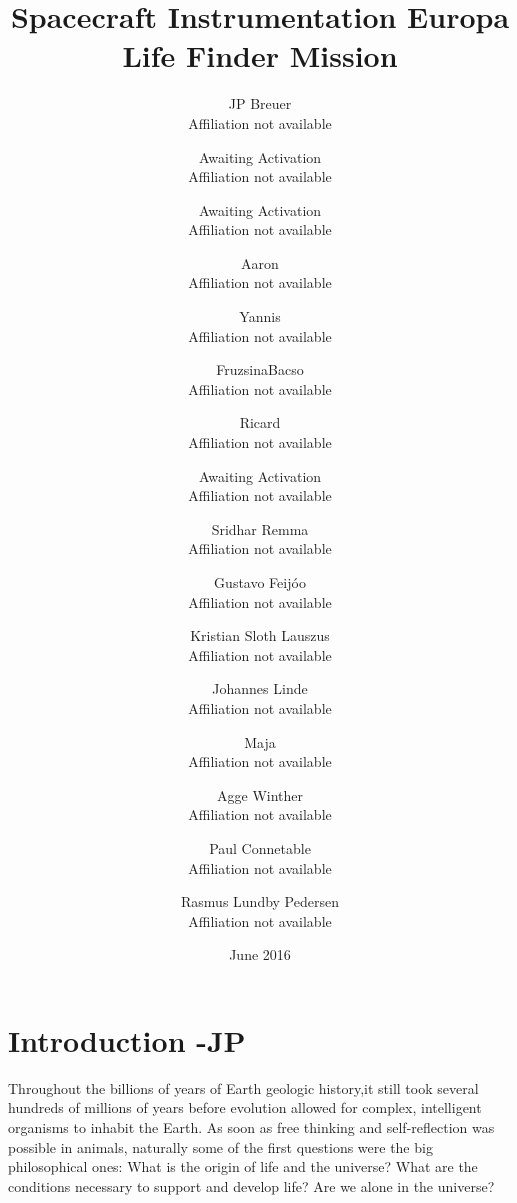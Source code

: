 \documentclass{book}
\date{June 2016}
\begin{document}
\author{JP Breuer\\ Affiliation not available  \and Awaiting Activation\\ Affiliation not available \and Awaiting Activation\\ Affiliation not available \and Aaron\\ Affiliation not available \and Yannis\\ Affiliation not available \and FruzsinaBacso\\ Affiliation not available \and Ricard\\ Affiliation not available \and Awaiting Activation\\ Affiliation not available \and Sridhar Remma\\ Affiliation not available \and Gustavo Feijóo\\ Affiliation not available \and Kristian Sloth Lauszus\\ Affiliation not available \and Johannes Linde\\ Affiliation not available \and Maja\\ Affiliation not available \and Agge Winther\\ Affiliation not available \and Paul Connetable\\ Affiliation not available \and Rasmus Lundby Pedersen\\ Affiliation not available}


\title{Spacecraft Instrumentation Europa Life Finder Mission}



\maketitle

\frontmatter
\tableofcontents
\newpage



\section{Introduction -JP}

Throughout the billions of years of Earth geologic history,it still took several hundreds of millions of years before evolution allowed for complex, intelligent organisms to inhabit the Earth. As soon as free thinking and self-reflection was possible in animals, naturally some of the first questions were the big philosophical ones: What is the origin of life and the universe? What are the conditions necessary to support and develop life? Are we alone in the universe?
\end{document}
